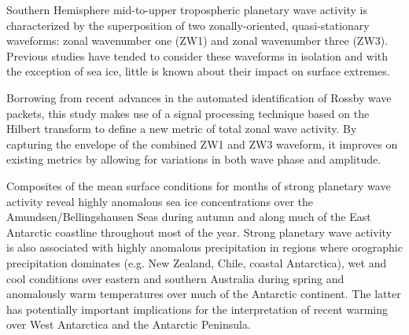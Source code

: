 Southern Hemisphere mid-to-upper tropospheric planetary wave activity is characterized by the superposition of two zonally-oriented, quasi-stationary waveforms: zonal wavenumber one (ZW1) and zonal wavenumber three (ZW3). Previous studies have tended to consider these waveforms in isolation and with the exception of sea ice, little is known about their impact on surface extremes. 

Borrowing from recent advances in the automated identification of Rossby wave packets, this study makes use of a signal processing technique based on the Hilbert transform to define a new metric of total zonal wave activity. By capturing the envelope of the combined ZW1 and ZW3 waveform, it improves on existing metrics by allowing for variations in both wave phase and amplitude.

Composites of the mean surface conditions for months of strong planetary wave activity reveal highly anomalous sea ice concentrations over the Amundsen/Bellingshausen Seas during autumn and along much of the East Antarctic coastline throughout most of the year. Strong planetary wave activity is also associated with highly anomalous precipitation in regions where orographic precipitation dominates (e.g. New Zealand, Chile, coastal Antarctica), wet and cool conditions over eastern and southern Australia during spring and anomalously warm temperatures over much of the Antarctic continent. The latter has potentially important implications for the interpretation of recent warming over West Antarctica and the Antarctic Peninsula.
